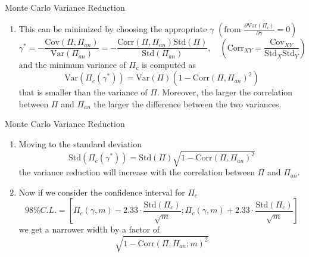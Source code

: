 \documentclass{beamer}
\begin{document}
\begin{frame}{Monte Carlo Variance Reduction}
	\begin{enumerate}\addtocounter{enumi}{2}
			\item This can be minimized by choosing the appropriate $\gamma$ $\left(\text{from }\frac{\partial \text{Var}(\Pi_c)}{\partial\gamma}=0\right)$
			\begin{equation*}
					\gamma^* = -\frac{\text{Cov}(\Pi, \Pi_{an})}{\text{Var}(\Pi_{an})} = -\frac{\text{Corr}(\Pi, \Pi_{an})\text{Std}(\Pi)}{\text{Std}(\Pi_{an})}, \quad \left(\text{Corr}_{XY}=\frac{\text{Cov}_{XY}}{\text{Std}_X \text{Std}_Y}\right)
				\end{equation*}
			and the minimum variance of $\Pi_c$ is computed as
			\begin{equation*}
					\text{Var}(\Pi_c(\gamma^*)) = \text{Var}(\Pi)(1 - \text{Corr}(\Pi, \Pi_{an})^2)
				\end{equation*}
			that is \textcolor{maincolor}{smaller than the variance of $\Pi$}. Moreover, the \textcolor{maincolor}{larger the correlation between $\Pi$ and $\Pi_{an}$ the larger the difference between the two variances}.
		\end{enumerate}
\end{frame}

\begin{frame}{Monte Carlo Variance Reduction}
	\begin{enumerate}\addtocounter{enumi}{3}
			\item<1-> Moving to the standard deviation
			\begin{equation*}
					\text{Std}(\Pi_c(\gamma^*)) = \text{Std}(\Pi) \sqrt{1 - \text{Corr}(\Pi, \Pi_{an})^2}
				\end{equation*}
			the variance reduction will increase with the correlation between $\Pi$ and $\Pi_{an}$.
			\item<2-> Now if we consider the confidence interval for $\Pi_c$
			\begin{equation*}
					98\% C.L. =\left[\Pi_c(\gamma,m) - 2.33\cdot\frac{\text{Std}(\Pi_c)}{\sqrt{m}};\Pi_c(\gamma,m) + 2.33\cdot\frac{\text{Std}(\Pi_c)}{\sqrt{m}}\right]
				\end{equation*}
			we get a narrower width by a factor of
			\begin{equation*}
					\sqrt{1 - \text{Corr}(\Pi, \Pi_{an}; m)^2}
				\end{equation*}
		\end{enumerate}
\end{frame}
\end{document}
